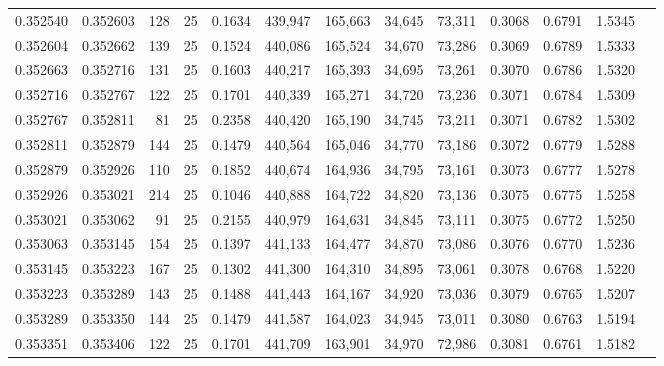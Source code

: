 \begin{tabular}{rrrrrrrrrrrrr}
0.352540 & 0.352603 &   128 &  25 &                                     0.1634 & 439,947 & 165,663 &  34,645 &  73,311 & 0.3068 & 0.6791 & 1.5345 \\
0.352604 & 0.352662 &   139 &  25 &                                     0.1524 & 440,086 & 165,524 &  34,670 &  73,286 & 0.3069 & 0.6789 & 1.5333 \\
0.352663 & 0.352716 &   131 &  25 &                                     0.1603 & 440,217 & 165,393 &  34,695 &  73,261 & 0.3070 & 0.6786 & 1.5320 \\
0.352716 & 0.352767 &   122 &  25 &                                     0.1701 & 440,339 & 165,271 &  34,720 &  73,236 & 0.3071 & 0.6784 & 1.5309 \\
0.352767 & 0.352811 &    81 &  25 &                                     0.2358 & 440,420 & 165,190 &  34,745 &  73,211 & 0.3071 & 0.6782 & 1.5302 \\
0.352811 & 0.352879 &   144 &  25 &                                     0.1479 & 440,564 & 165,046 &  34,770 &  73,186 & 0.3072 & 0.6779 & 1.5288 \\
0.352879 & 0.352926 &   110 &  25 &                                     0.1852 & 440,674 & 164,936 &  34,795 &  73,161 & 0.3073 & 0.6777 & 1.5278 \\
0.352926 & 0.353021 &   214 &  25 &                                     0.1046 & 440,888 & 164,722 &  34,820 &  73,136 & 0.3075 & 0.6775 & 1.5258 \\
0.353021 & 0.353062 &    91 &  25 &                                     0.2155 & 440,979 & 164,631 &  34,845 &  73,111 & 0.3075 & 0.6772 & 1.5250 \\
0.353063 & 0.353145 &   154 &  25 &                                     0.1397 & 441,133 & 164,477 &  34,870 &  73,086 & 0.3076 & 0.6770 & 1.5236 \\
0.353145 & 0.353223 &   167 &  25 &                                     0.1302 & 441,300 & 164,310 &  34,895 &  73,061 & 0.3078 & 0.6768 & 1.5220 \\
0.353223 & 0.353289 &   143 &  25 &                                     0.1488 & 441,443 & 164,167 &  34,920 &  73,036 & 0.3079 & 0.6765 & 1.5207 \\
0.353289 & 0.353350 &   144 &  25 &                                     0.1479 & 441,587 & 164,023 &  34,945 &  73,011 & 0.3080 & 0.6763 & 1.5194 \\
0.353351 & 0.353406 &   122 &  25 &                                     0.1701 & 441,709 & 163,901 &  34,970 &  72,986 & 0.3081 & 0.6761 & 1.5182 \\

\end{tabular}
